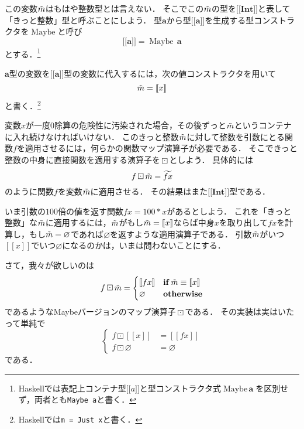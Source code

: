 \documentclass[twocolumn]{jsbook}
\def\[{[\![}
\def\]{]\!]}
\newcommand{\hsklType}[1]{\textbf{#1}}
\newcommand{\hsklTypeConstructor}[1]{\mathop{\mathrm{#1}}}
\DeclareMathOperator{\hsklMaybeConstructor}{\hsklTypeConstructor{Maybe}}
\DeclareMathOperator{\hsklMaybeMap}{\boxdot}
\newcommand{\hsklInt}{\hsklType{Int}}
\newcommand{\hsklNothing}{\varnothing}
\newcommand{\hsklJust}[1]{\[#1\]}
\newcommand{\hsklMaybe}[1]{\Tilde{#1}}
\newcommand{\hsklMaybeW}[1]{\widetilde{#1}}
\newcommand{\hsklMaybeType}[1]{\boldsymbol{\[}#1\boldsymbol{\]}}
\newcommand{\hsklTypeConstruct}[2]{#1\,#2}
\newcommand{\mathKeyword}[1]{\mathbf{#1}}
\DeclareMathOperator{\mathIf}{\mathKeyword{if}}
\newcommand{\mathOtherwise}{\mathKeyword{otherwise}}
\newcommand{\code}[1]{\texttt{#1}}
\begin{document}
この変数$\hsklMaybe{m}$はもはや整数型とは言えない．
そこでこの$\hsklMaybe{m}$の型を$\hsklMaybeType{\hsklInt}$と表して「きっと整数」型と呼ぶことにしよう．
型$\hsklType{a}$から型$\hsklMaybeType{\hsklType{a}}$を生成する型コンストラクタを$\hsklMaybeConstructor$と呼び$$\hsklMaybeType{\hsklType{a}}=\hsklTypeConstruct{\hsklMaybeConstructor}{\hsklType{a}}$$とする．\footnote{Haskellでは表記上コンテナ型$\hsklMaybeType{a}$と型コンストラクタ式$\hsklTypeConstruct{\hsklMaybeConstructor}{\hsklType{a}}$を区別せず，両者とも\code{Maybe a}と書く．}

$\hsklType{a}$型の変数を$\hsklMaybeType{\hsklType{a}}$型の変数に代入するには，次の値コンストラクタを用いて
$$\hsklMaybe{m}=\hsklJust{x}$$
と書く．\footnote{Haskellでは\code{m = Just x}と書く．}

変数$x$が一度$0$除算の危険性に汚染された場合，その後ずっと$\hsklMaybe{m}$というコンテナに入れ続けなければいけない．
このきっと整数$\hsklMaybe{m}$に対して整数を引数にとる関数$f$を適用させるには，何らかの関数マップ演算子が必要である．
そこできっと整数の中身に直接関数を適用する演算子を$\hsklMaybeMap$としよう．
具体的には$$f\hsklMaybeMap\hsklMaybe{m}=\hsklMaybeW{fx}$$のように関数$f$を変数$\hsklMaybe{m}$に適用させる．
その結果はまた$\hsklMaybeType{\hsklInt}$型である．

いま引数の$100$倍の値を返す関数$fx=100*x$があるとしよう．
これを「きっと整数」な$\hsklMaybe{m}$に適用するには，$\hsklMaybe{m}$がもし$\hsklMaybe{m}=\hsklJust{x}$ならば中身$x$を取り出して$fx$を計算し，もし$\hsklMaybe{m}=\hsklNothing$であれば$\hsklNothing$を返すような適用演算子である．
引数$\hsklMaybe{m}$がいつ$\hsklJust{x}$でいつ$\hsklNothing$になるのかは，いまは問わないことにする．

さて，我々が欲しいのは
\begin{equation*}
f\hsklMaybeMap\hsklMaybe{m}=\begin{cases}
\hsklJust{fx}&\mathIf\hsklMaybe{m}\equiv\hsklJust{x}\\
\hsklNothing&\mathOtherwise
\end{cases}
\end{equation*}
であるようなMaybeバージョンのマップ演算子$\hsklMaybeMap$である．
その実装は実はいたって単純で
\begin{equation*}
\left\{
\begin{split}
f\hsklMaybeMap\hsklJust{x}&=\hsklJust{fx}\\
f\hsklMaybeMap\hsklNothing&=\hsklNothing
\end{split}
\right.
\end{equation*}
である．
\end{document}

